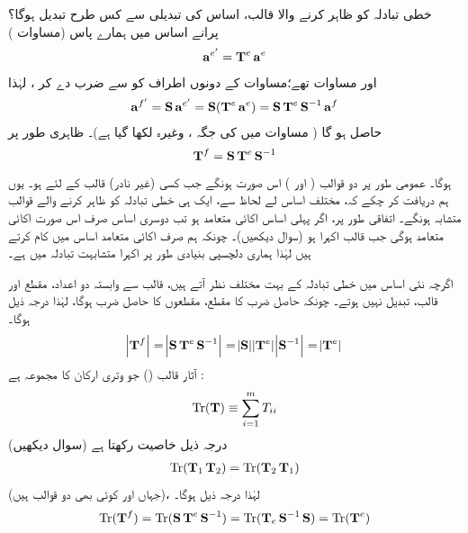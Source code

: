 خطی تبادلہ  کو ظاہر کرنے والا قالب،  اساس کی تبدیلی سے کس طرح تبدیل ہوگا؟ پرانے اساس میں ہمارے پاس   (مساوات )
\begin{align*}
	\operatorname{\mathbf{a}}^{e'} = \operatorname{\mathbf{T}}^e\operatorname{\mathbf{a}}^e
\end{align*}
اور مساوات   تھے؛مساوات    کے   دونوں اطراف کو  سے ضرب دے کر     ،  لہٰذا   
\begin{align*}
	\operatorname{\mathbf{a}}^{f'} = \operatorname{\mathbf{S}}\operatorname{\mathbf{a}}^{e'} = \operatorname{\mathbf{S}}(\operatorname{\mathbf{T}}^e\operatorname{\mathbf{a}}^e) = \operatorname{\mathbf{S}}\operatorname{\mathbf{T}}^e\operatorname{\mathbf{S}}^{-1}\operatorname{\mathbf{a}}^f
\end{align*}
حاصل  ہو گا ( مساوات   میں  کی جگہ ، وغیرہ لکھا گیا ہے)۔ ظاہری طور پر
\begin{align}\label{مساوات_ضمیمہ_دوسرا_اساس}
	\operatorname{\mathbf{T}}^f = \operatorname{\mathbf{S}}\operatorname{\mathbf{T}}^e\operatorname{\mathbf{S}}^{-1}
\end{align}
ہوگا۔ عمومی طور پر دو قوالب (  اور ) اس صورت    ہونگے جب کسی (غیر نادر)  قالب  کے لئے   ہو۔ یوں ہم دریافت کر چکے کہ،  مختلف اساس لے لحاظ سے،  ایک ہی خطی تبادلہ کو ظاہر کرنے والے قوالب متشابہ ہونگے۔ اتفاقی طور پر،  اگر پہلی اساس اکائی متعامد ہو تب دوسری اساس صرف اس صورت  اکائی متعامد ہوگی  جب قالب  اکہرا ہو  (سوال  دیکھیں)۔ چونکہ ہم صرف اکائی متعامد اساس میں کام کرتے ہیں لہٰذا ہماری دلچسپی بنیادی طور پر  اکہرا  متشابہت  تبادلہ میں ہے۔

اگرچہ نئی اساس میں  خطی تبادلہ کے   بہت مختلف نظر آتے ہیں،  قالب سے وابستہ دو اعداد،  مقطع اور    قالب،  تبدیل نہیں ہوتے۔ چونکہ حاصل ضرب کا مقطع،  مقطعوں  کا حاصل ضرب ہوگا،  لہٰذا درجہ ذیل ہوگا۔
\begin{align}\label{مساوات_ضمیمہ_حاصل_ضرب}
	\abs{\operatorname{\mathbf{T}}^f} = \abs{\operatorname{\mathbf{S}}\operatorname{\mathbf{T}}^e\operatorname{\mathbf{S}}^{-1}} = \abs{\operatorname{\mathbf{S}}}\abs{\operatorname{\mathbf{T}}^e}\abs{\operatorname{\mathbf{S}}^{-1}} = \abs{\operatorname{\mathbf{T}}^e}
\end{align}
 آثار قالب  () جو وتری ارکان کا مجموعہ ہے :
\begin{align}
	\operatorname{Tr}(\operatorname{\mathbf{T}})\equiv\sum_{i=1}^{m}T_{ii}
\end{align}
درجہ ذیل خاصیت رکھتا ہے  (سوال   دیکھیں)
\begin{align}
	\operatorname{Tr}(\operatorname{\mathbf{T}}_1\operatorname{\mathbf{T}}_2) = \operatorname{Tr}(\operatorname{\mathbf{T}}_2\operatorname{\mathbf{T}}_1)
\end{align}
 (جہاں  اور  کوئی بھی دو قوالب ہیں)،   لہٰذا درجہ ذیل ہوگا۔
\begin{align}\label{مساوات_ضمیمہ_آثار}
	\operatorname{Tr}(\operatorname{\mathbf{T}}^f) = \operatorname{Tr}(\operatorname{\mathbf{S}}\operatorname{\mathbf{T}}^e\operatorname{\mathbf{S}}^{-1}) = \operatorname{Tr}(\operatorname{\mathbf{T}}_e\operatorname{\mathbf{S}}^{-1}\operatorname{\mathbf{S}}) = \operatorname{Tr}(\operatorname{\mathbf{T}}^e)
\end{align}


